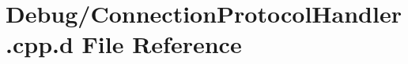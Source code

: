 \hypertarget{_debug_2_connection_protocol_handler_8cpp_8d}{\section{\-Debug/\-Connection\-Protocol\-Handler.cpp.\-d \-File \-Reference}
\label{_debug_2_connection_protocol_handler_8cpp_8d}
}

